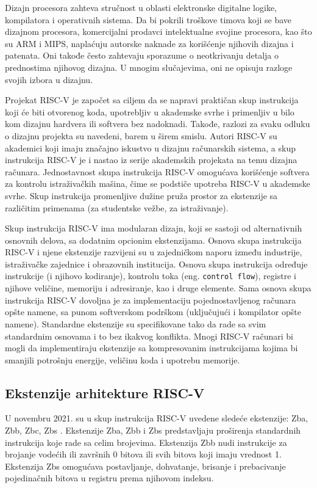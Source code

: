 \documentclass[12pt,oneside]{memoir}
\begin{document}
Dizajn procesora zahteva stručnost u oblasti elektronske digitalne logike, kompilatora i operativnih sistema. Da bi pokrili troškove timova koji se bave dizajnom procesora, 
komercijalni prodavci intelektualne svojine procesora, kao što su ARM i MIPS, naplaćuju autorske naknade za korišćenje njihovih dizajna i patenata. Oni takođe često zahtevaju sporazume o neotkrivanju detalja o prednostima njihovog dizajna. U mnogim slučajevima, oni ne opisuju razloge svojih izbora u dizajnu.

Projekat RISC-V je započet sa ciljem da se napravi praktičan skup instrukcija koji će biti otvorenog koda, upotrebljiv u akademske svrhe i primenljiv u bilo kom dizajnu hardvera ili softvera bez nadoknadi. Takođe, razlozi za svaku odluku o dizajnu projekta su navedeni, barem u širem smislu. Autori RISC-V su akademici koji imaju značajno iskustvo u dizajnu računarskih sistema, a skup instrukcija RISC-V je i nastao iz serije akademskih projekata na temu dizajna računara. Jednostavnost skupa instrukcija RISC-V omogućava korišćenje softvera za kontrolu istraživačkih mašina, čime se podstiče upotreba RISC-V u akademske svrhe. Skup instrukcija promenljive dužine pruža prostor za ekstenzije sa različitim primenama (za studentske vežbe, za istraživanje).

Skup instrukcija RISC-V ima modularan dizajn, koji se sastoji od alternativnih osnovnih delova, sa dodatnim opcionim ekstenzijama. Osnova skupa instrukcija RISC-V i njene ekstenzije razvijeni su u zajedničkom naporu između industrije, istraživačke zajednice i obrazovnih institucija. Osnova skupa instrukcija određuje instrukcije (i njihovo kodiranje), kontrolu toka (eng. \texttt{control flow}), registre i njihove veličine, memoriju i adresiranje, kao i druge elemente. Sama osnova skupa instrukcija RISC-V dovoljna je za implementaciju pojednostavljenog računara opšte namene, sa punom softverskom podrškom (uključujući i kompilator opšte namene). Standardne ekstenzije su specifikovane tako da rade sa svim standardnim osnovama i to bez ikakvog konflikta. Mnogi RISC-V računari bi mogli da implementiraju ekstenzije sa kompresovanim instrukcijama kojima bi smanjili potrošnju energije, veličinu koda i upotrebu memorije.

\subsection{Ekstenzije arhitekture RISC-V}
U novembru 2021. su u skup instrukcija RISC-V uvedene sledeće ekstenzije: Zba, Zbb, Zbc, Zbs \cite{riscv_bitmanip}.
Ekstenzije Zba, Zbb i Zbs predstavljaju proširenja standardnih instrukcija koje rade sa celim brojevima. Ekstenzija Zbb nudi instrukcije za brojanje vodećih ili završnih 0 bitova ili svih bitova koji imaju vrednost 1. Ekstenzija Zbs omogućava postavljanje, dohvatanje, brisanje i prebacivanje pojedinačnih bitova u registru prema njihovom indeksu. 
\end{document}
